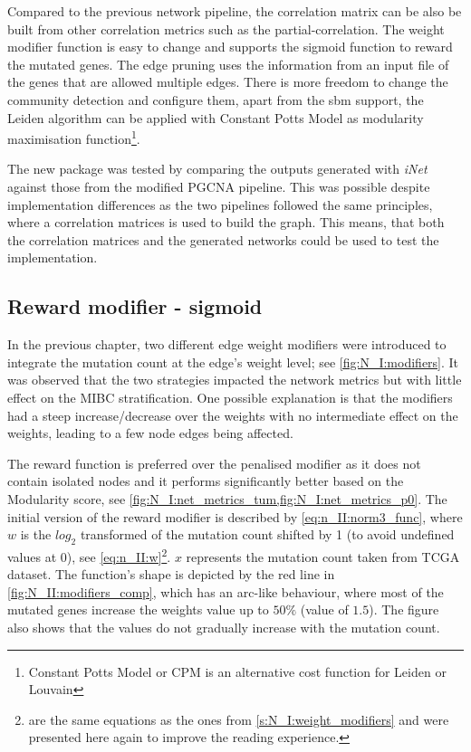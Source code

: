 Compared to the previous network pipeline, the correlation matrix can be also be built from other correlation metrics such as the partial-correlation. The weight modifier function is easy to change and supports the sigmoid function to reward the mutated genes. The edge pruning uses the information from an input file of the genes that are allowed multiple edges. There is more freedom to change the community detection and configure them, apart from the \acrfull{sbm} support, the Leiden algorithm can be applied with Constant Potts Model as modularity maximisation function\footnote{Constant Potts Model or CPM is an alternative cost function for Leiden or Louvain}.

The new package was tested by comparing the outputs generated with \textit{iNet} against those from the modified PGCNA pipeline. This was possible despite implementation differences as the two pipelines followed the same principles, where a correlation matrices is used to build the graph. This means, that both the correlation matrices and the generated networks could be used to test the implementation.

\subsection*{Reward modifier - sigmoid} \label{s:N_II:reward}

In the previous chapter, two different edge weight modifiers were introduced to integrate the mutation count at the edge's weight level; see \cref{fig:N_I:modifiers}. It was observed that the two strategies impacted the network metrics but with little effect on the MIBC stratification. One possible explanation is that the modifiers had a steep increase/decrease over the weights with no intermediate effect on the weights, leading to a few node edges being affected. 

The reward function is preferred over the penalised modifier as it does not contain isolated nodes and it performs significantly better based on the Modularity score, see \cref{fig:N_I:net_metrics_tum,fig:N_I:net_metrics_p0}. The initial version of the reward modifier is described by \cref{eq:n_II:norm3_func}, where $w$ is the $log_2$ transformed of the mutation count shifted by 1 (to avoid undefined values at 0), see \cref{eq:n_II:w}\footnote{ are the same equations as the ones from \cref{s:N_I:weight_modifiers} and were presented here again to improve the reading experience.}. $x$ represents the mutation count taken from TCGA dataset. The function's shape is depicted by the red line in \cref{fig:N_II:modifiers_comp}, which has an arc-like behaviour, where most of the mutated genes increase the weights value up to $50\%$ (value of $1.5$). The figure also shows that the values do not gradually increase with the mutation count.

